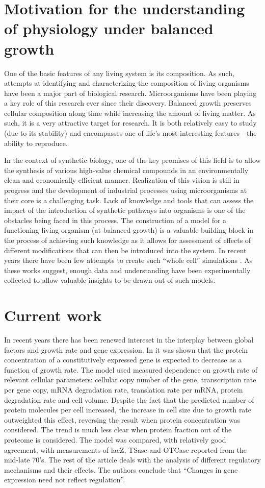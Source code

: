 \documentclass{report}
\begin{document}
\section{Motivation for the understanding of physiology under balanced growth}
One of the basic features of any living system is its composition.
As such, attempts at identifying and characterizing the composition of living organisms have been a major part of biological research\cite{Schaechter1958,Bremer1987}.
Microorganisms have been playing a key role of this research ever since their discovery.
Balanced growth preserves cellular composition along time while increasing the amount of living matter.
As such, it is a very attractive target for research.
It is both relatively easy to study (due to its stability) and encompasses one of life's most interesting features - the ability to reproduce.

In the context of synthetic biology, one of the key promises of this field is to allow the synthesis of various high-value chemical compounds in an environmentally clean and economically efficient manner.
Realization of this vision is still in progress and the development of industrial processes using microorganisms at their core is a challenging task.
Lack of knowledge and tools that can assess the impact of the introduction of synthetic pathways into organisms is one of the obstacles being faced in this process.
The construction of a model for a functioning living organism (at balanced growth) is a valuable building block in the process of achieving such knowledge as it allows for assessment of effects of different modifications that can then be introduced into the system.
In recent years there have been few attempts to create such “whole cell” simulations \cite{Lerman2012,Karr2012,Reed2004,Schellenberger2011a}.
As these works suggest, enough data and understanding have been experimentally collected to allow valuable insights to be drawn out of such models.
\section{Current work}
In recent years there has been renewed intereset in the interplay between global factors and growth rate and gene expression.
In \cite{Klumpp2009a} it was shown that the protein concentration of a constitutively expressed gene is expected to decrease as a function of growth rate.
The model used measured dependence on growth rate of relevant cellular parameters: cellular copy number of the gene, transcription rate per gene copy, mRNA degradation rate, translation rate per mRNA, protein degradation rate and cell volume.
Despite the fact that the predicted number of protein molecules per cell increased, the increase in cell size due to growth rate outweighted this effect, reversing the result when protein concentration was considered.
The trend is much less clear when protein fraction out of the proteome is considered.
The model was compared, with relatively good agreement, with measurements of lacZ, TSase and OTCase reported from the mid-late 70's.
The rest of the article deals with the analysis of different regulatory mechanisms and their effects.
The authors conclude that ``Changes in gene expression need not reflect regulation''.
\end{document}
